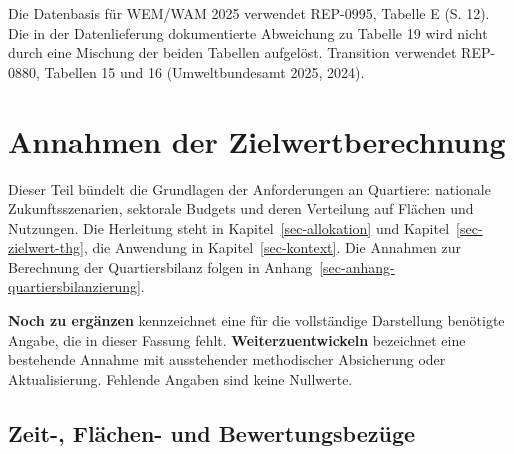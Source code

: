 \documentclass[
  ngerman,
  a4paper,
  DIV=11]{scrreprt}
\begin{document}
Die Datenbasis für WEM/WAM 2025 verwendet REP-0995, Tabelle E (S. 12).
Die in der Datenlieferung dokumentierte Abweichung zu Tabelle 19 wird
nicht durch eine Mischung der beiden Tabellen aufgelöst. Transition
verwendet REP-0880, Tabellen 15 und 16 (Umweltbundesamt 2025, 2024).

\chapter{Annahmen der Zielwertberechnung}\label{sec-anhang}

Dieser Teil bündelt die Grundlagen der Anforderungen an Quartiere:
nationale Zukunftsszenarien, sektorale Budgets und deren Verteilung auf
Flächen und Nutzungen. Die Herleitung steht in
Kapitel~\ref{sec-allokation} und Kapitel~\ref{sec-zielwert-thg}, die
Anwendung in Kapitel~\ref{sec-kontext}. Die Annahmen zur Berechnung der
Quartiersbilanz folgen in Anhang~\ref{sec-anhang-quartiersbilanzierung}.

\textbf{Noch zu ergänzen} kennzeichnet eine für die vollständige
Darstellung benötigte Angabe, die in dieser Fassung fehlt.
\textbf{Weiterzuentwickeln} bezeichnet eine bestehende Annahme mit
ausstehender methodischer Absicherung oder Aktualisierung. Fehlende
Angaben sind keine Nullwerte.

\section{Zeit-, Flächen- und
Bewertungsbezüge}\label{zeit--fluxe4chen--und-bewertungsbezuxfcge}
\end{document}
